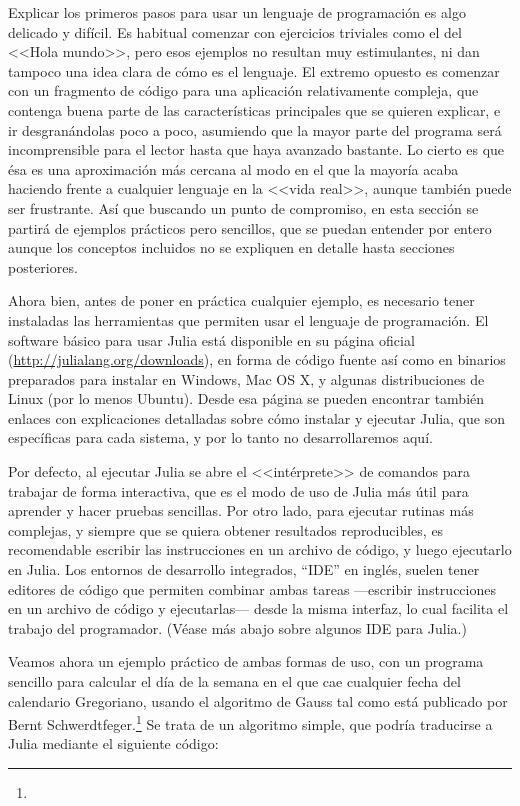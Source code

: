 ﻿\documentclass[spanish]{article}
\begin{document}
Explicar los primeros pasos para usar un lenguaje de programación es algo
delicado y difícil. Es habitual comenzar con ejercicios triviales como el
del <<Hola mundo>>, pero esos ejemplos no resultan muy estimulantes, ni dan
tampoco una idea clara de cómo es el lenguaje. El extremo opuesto es comenzar
con un fragmento de código para una aplicación relativamente compleja, que
contenga buena parte de las características principales que se quieren
explicar, e ir desgranándolas poco a poco, asumiendo que la mayor parte del
programa será incomprensible para el lector hasta que haya avanzado
bastante. Lo cierto es que ésa es una aproximación más cercana al modo en el
que la mayoría acaba haciendo frente a cualquier lenguaje en la <<vida real>>,
aunque también puede ser frustrante. Así que buscando un punto de
compromiso, en esta sección se partirá de ejemplos prácticos pero sencillos,
que se puedan entender por entero aunque los conceptos incluidos no se
expliquen en detalle hasta secciones posteriores.

Ahora bien, antes de poner en práctica cualquier ejemplo, es necesario
tener instaladas las herramientas que permiten usar el lenguaje de programación.
El software básico para usar Julia está disponible en su página oficial (\url{http://julialang.org/downloads}),
en forma de código fuente así como en binarios preparados para instalar
en Windows, Mac OS X, y algunas distribuciones de Linux (por lo menos
Ubuntu). Desde esa página se pueden encontrar también enlaces con
explicaciones detalladas sobre cómo instalar y ejecutar Julia, que son
específicas para cada sistema, y por lo tanto no desarrollaremos aquí.

Por defecto, al ejecutar Julia se abre el <<intérprete>> de comandos
para trabajar de forma interactiva, que es el modo de uso de Julia
más útil para aprender y hacer pruebas sencillas.
Por otro lado, para ejecutar rutinas más complejas, y siempre que
se quiera obtener resultados reproducibles, es recomendable escribir
las instrucciones en un archivo de código, y luego ejecutarlo en Julia.
Los entornos de desarrollo integrados, ``IDE'' en inglés, suelen tener
editores de código que permiten combinar ambas tareas ---escribir instrucciones
en un archivo de código y ejecutarlas--- desde la misma interfaz, lo cual
facilita el trabajo del programador. (Véase más abajo sobre algunos IDE para Julia.)

Veamos ahora un ejemplo práctico de ambas formas de uso, con un programa
sencillo para calcular el día de la semana en el que cae cualquier fecha
del calendario Gregoriano, usando el algoritmo de Gauss
tal como está publicado por Bernt Schwerdtfeger.\footnote{%
}%
Se trata de un algoritmo simple, que podría traducirse a Julia mediante el
siguiente código:
\end{document}
